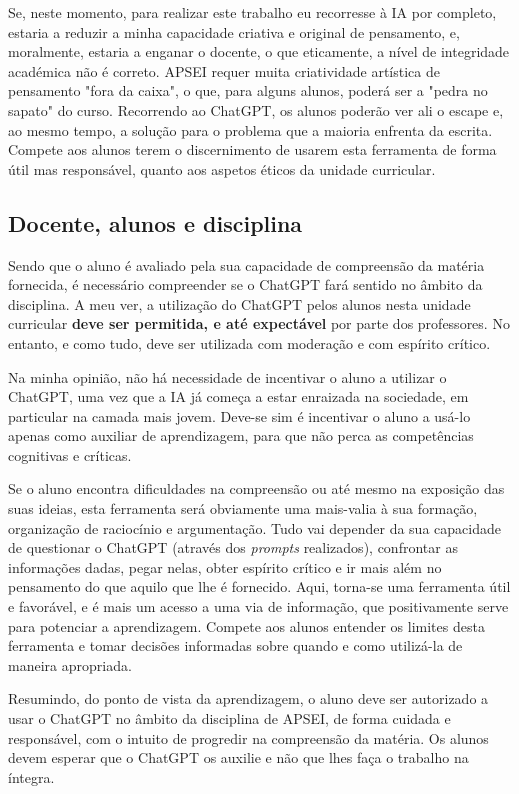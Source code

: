 \documentclass[portuguese, 11pt, a4paper, titlepage, oneside]{article}
\begin{document}
Se, neste momento, para realizar este trabalho eu recorresse à IA por completo, estaria a reduzir a minha capacidade criativa e original de pensamento, e, moralmente, estaria a enganar o docente, o que eticamente, a nível de integridade académica não é correto. APSEI requer muita criatividade artística de pensamento "fora da caixa", o que, para alguns alunos, poderá ser a "pedra no sapato" do curso. Recorrendo ao ChatGPT, os alunos poderão ver ali o escape e, ao mesmo tempo, a solução para o problema que a maioria enfrenta da escrita. Compete aos alunos terem o discernimento de usarem esta ferramenta de forma útil mas responsável, quanto aos aspetos éticos da unidade curricular.

\subsection{Docente, alunos e disciplina}
Sendo que o aluno é avaliado pela sua capacidade de compreensão da matéria fornecida, é necessário compreender se o ChatGPT fará sentido no âmbito da disciplina. A meu ver, a utilização do ChatGPT pelos alunos nesta unidade curricular \textbf{deve ser permitida, e até expectável} por parte dos professores. No entanto, e como tudo, deve ser utilizada com moderação e com espírito crítico.

Na minha opinião, não há necessidade de incentivar o aluno a utilizar o ChatGPT, uma vez que a IA já começa a estar enraizada na sociedade, em particular na camada mais jovem. Deve-se sim é incentivar o aluno a usá-lo apenas como auxiliar de aprendizagem, para que não perca as competências cognitivas e críticas.

Se o aluno encontra dificuldades na compreensão ou até mesmo na exposição das suas ideias, esta ferramenta será obviamente uma mais-valia à sua formação, organização de raciocínio e argumentação. Tudo vai depender da sua capacidade de questionar o ChatGPT (através dos \textit{prompts} realizados), confrontar as informações dadas, pegar nelas, obter espírito crítico e ir mais além no pensamento do que aquilo que lhe é fornecido. Aqui, torna-se uma ferramenta útil e favorável, e é mais um acesso a uma via de informação, que positivamente serve para potenciar a aprendizagem. Compete aos alunos entender os limites desta ferramenta e tomar decisões informadas sobre quando e como utilizá-la de maneira apropriada.

Resumindo, do ponto de vista da aprendizagem, o aluno deve ser autorizado a usar o ChatGPT no âmbito da disciplina de APSEI, de forma cuidada e responsável, com o intuito de progredir na compreensão da matéria. Os alunos devem esperar que o ChatGPT os auxilie e não que lhes faça o trabalho na íntegra.
\end{document}

